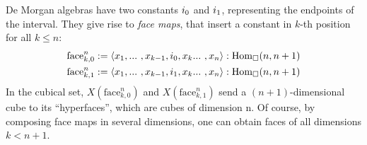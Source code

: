 % 
De Morgan algebras have two constants \( \izero \) and \( \ione \), 
representing the endpoints of the interval. They give rise to \emph{face maps},
that insert a constant in \( k \)-th position for all \( k \le n \):
% 
\begin{align*}
\mathrm{face}_{k,0}^n & := \langle x_1 , ...\ , x_{k-1} , \izero , x_{k} ...\ , x_n \rangle : \hom[\catCube]{n}{n+1} \\
\mathrm{face}_{k,1}^n & := \langle x_1 , ...\ , x_{k-1} , \ione , x_{k} ...\ , x_n \rangle : \hom[\catCube]{n}{n+1}
\end{align*}
% 
In the cubical set, \( X(\mathrm{face}_{k,0}^n) \) and 
\( X(\mathrm{face}_{k,1}^n) \) send a \( (n+1) \)-dimensional cube to its
``hyperfaces'', which are cubes of dimension n.
% 
Of course, by composing face maps in several 
dimensions, one can obtain faces of all dimensions \( k < n+1 \).

